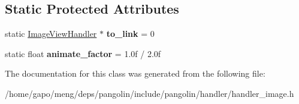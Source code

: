 \subsection*{Static Protected Attributes}
\begin{DoxyCompactItemize}
\item 
static \hyperlink{classpangolin_1_1_image_view_handler}{Image\+View\+Handler} $\ast$ {\bfseries to\+\_\+link} = 0\hypertarget{classpangolin_1_1_image_view_handler_a0172fec7cd8510058bcfd00409b681ff}{}\label{classpangolin_1_1_image_view_handler_a0172fec7cd8510058bcfd00409b681ff}

\item 
static float {\bfseries animate\+\_\+factor} = 1.\+0f / 2.\+0f\hypertarget{classpangolin_1_1_image_view_handler_a2f187b0a682e5ced6d6830c217de5d73}{}\label{classpangolin_1_1_image_view_handler_a2f187b0a682e5ced6d6830c217de5d73}

\end{DoxyCompactItemize}


The documentation for this class was generated from the following file\+:\begin{DoxyCompactItemize}
\item 
/home/gapo/meng/deps/pangolin/include/pangolin/handler/handler\+\_\+image.\+h\end{DoxyCompactItemize}
